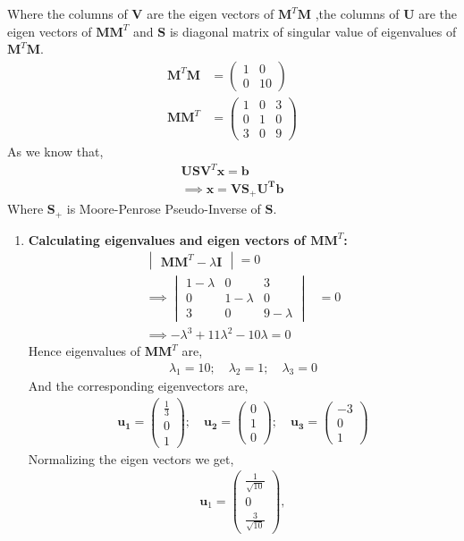 \documentclass[journal,12pt,twocolumn]{IEEEtran}
\let\vec\mathbf
\numberwithin{equation}{subsection}
\newcommand{\myvec}[1]{\ensuremath{\begin{pmatrix}#1\end{pmatrix}}}
\newcommand{\mydet}[1]{\ensuremath{\begin{vmatrix}#1\end{vmatrix}}}
\begin{document}
\begin{enumerate}
Where the columns of $\vec{V}$ are the eigen vectors of $\vec{M}^T\vec{M}$ ,the columns of $\vec{U}$ are the eigen vectors of $\vec{M}\vec{M}^T$ and $\vec{S}$ is diagonal matrix of singular value of eigenvalues of $\vec{M}^T\vec{M}$.
\begin{align}
    \vec{M}^T\vec{M} &= \myvec{1 & 0\\0 & 10} \\
    \vec{M}\vec{M}^T &= \myvec{1 & 0& 3\\0 & 1 & 0\\ 3 & 0 & 9} 
\end{align}
As we know that,
\begin{align}
    \vec{U} \vec{S} \vec{V}^T \vec{x} = \vec{b} \nonumber \\
    \implies \vec{x} = \vec{V} \vec{S_+} \vec{U^T} \vec{b} \label{eq:eq_9}
\end{align}
Where $\vec{S_+}$ is Moore-Penrose Pseudo-Inverse of $\vec{S}$.
\begin{enumerate}
\item \textbf{Calculating eigenvalues and eigen vectors of $\vec{M}\vec{M}^T$: }
\begin{align}
    \mydet{\vec{M} \vec{M}^T - \lambda \vec{I}} = 0 \nonumber \\
    \implies \mydet{1-\lambda & 0& 3\\0 & 1-\lambda & 0\\ 3 & 0 & 9-\lambda} &= 0 \nonumber \\
    \implies -\lambda^3 +11\lambda^2 -10\lambda =0 \nonumber
\end{align}
Hence eigenvalues of $\vec{M}\vec{M}^T$ are,
\begin{align} \label{eq:eq_10}
    \lambda_1 = 10; \quad \lambda_2 = 1; \quad \lambda_3 =0
\end{align}
And the corresponding eigenvectors are,
\begin{align}
    \vec{u_1} = \myvec{\frac{1}{3} \\ 0 \\ 1}; \quad \vec{u_2} = \myvec{0 \\ 1 \\ 0}; \quad
    \vec{u_3} = \myvec{-3\\ 0 \\ 1} \label{eq:eq_11} 
\end{align}
Normalizing the eigen vectors we get,
\begin{align}
\vec{u}_1=\myvec{\frac{1}{\sqrt{10}}\\0\\\frac{3}{\sqrt{10}}},

\end{align}
\end{enumerate}
\end{enumerate}
\end{document}
